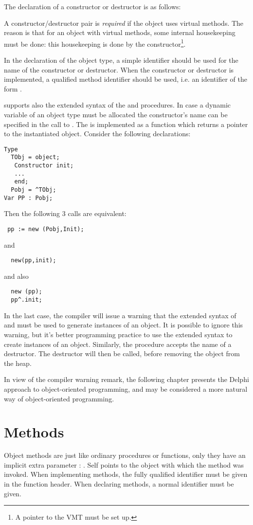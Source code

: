 The declaration of a constructor or destructor is as follows:

A constructor/destructor pair is {\em required} if the object uses virtual methods.
The reason is that for an object with virtual methods, some internal
housekeeping must be done: this housekeeping is done by the
constructor\footnote{A pointer to the VMT must be set up.}.

In the declaration of the object type, a simple identifier should be used
for the name of the constructor or destructor. When the constructor or destructor
is implemented, a qualified method identifier should be used,
i.e. an identifier of the form .

\fpc supports also the extended syntax of the  and 
procedures. In case a dynamic variable of an object type must be allocated
the constructor's name can be specified in the call to .
The  is implemented as a function which returns a pointer to the
instantiated object. Consider the following declarations:
\begin{verbatim}
Type
  TObj = object;
   Constructor init;
   ...
   end;
  Pobj = ^TObj;
Var PP : Pobj;
\end{verbatim}
Then the following 3 calls are equivalent:
\begin{verbatim}
 pp := new (Pobj,Init);
\end{verbatim}
and
\begin{verbatim}
  new(pp,init);
\end{verbatim}
and also
\begin{verbatim}
  new (pp);
  pp^.init;
\end{verbatim}
In the last case, the compiler will issue a warning that the
extended syntax of  and  must be used to generate instances of an
object. It is possible to ignore this warning, but it's better programming practice to
use the extended syntax to create instances of an object.
Similarly, the  procedure accepts the name of a destructor. The
destructor will then be called, before removing the object from the heap.

In view of the compiler warning remark, the following chapter presents the
Delphi approach to object-oriented programming, and may be considered a
more natural way of object-oriented programming.

\section{Methods}
Object methods are just like ordinary procedures or functions, only they
have an implicit extra parameter : . Self points to the object
with which the method was invoked.
When implementing methods, the fully qualified identifier must be given
in the function header. When declaring methods, a normal identifier must be
given.

